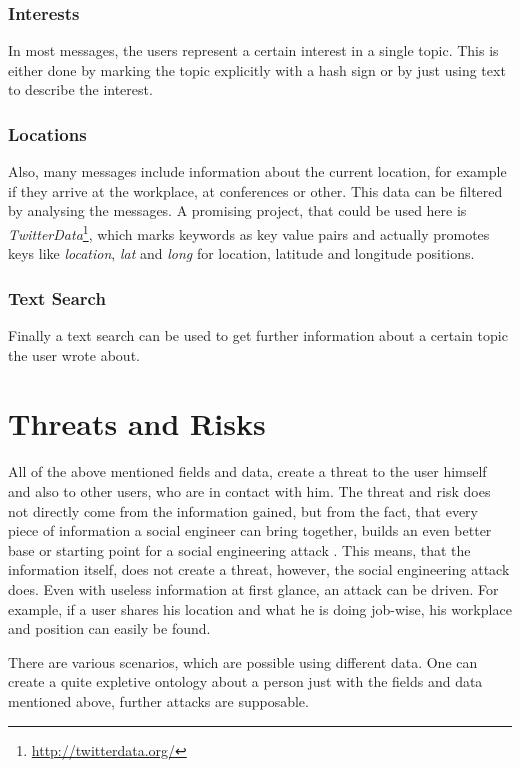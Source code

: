 \subsubsection{Interests}

In most messages, the users represent a certain interest in a single topic.
This is either done by marking the topic explicitly with a hash sign or by just
using text to describe the interest. 

\subsubsection{Locations}

Also, many messages include information about the current location, for example
if they arrive at the workplace, at conferences or other. This data can be
filtered by analysing the messages. A promising project, that could be used
here is \textit{TwitterData}\footnote{\url{http://twitterdata.org/}}, which
marks keywords as key value pairs and actually promotes keys like
\textit{location}, \textit{lat} and \textit{long} for location, latitude and longitude
positions.

\subsubsection{Text Search}

Finally a text search can be used to get further information about a certain
topic the user wrote about. 

\section{Threats and Risks}

All of the above mentioned fields and data, create a threat to the user himself
and also to other users, who are in contact with him. The threat and risk does
not directly come from the information gained, but from the fact, that every
piece of information a social engineer can bring together, builds an even
better base or starting point for a social engineering attack
\cite{mitnick2003}. This means, that the information itself, does not create a
threat, however, the social engineering attack does. Even with useless
information at first glance, an attack can be driven. For example, if a user
shares his location and what he is doing job-wise, his workplace and position
can easily be found.

There are various scenarios, which are possible using different data. One can
create a quite expletive ontology about a person just with the fields and data
mentioned above, further attacks are supposable.

